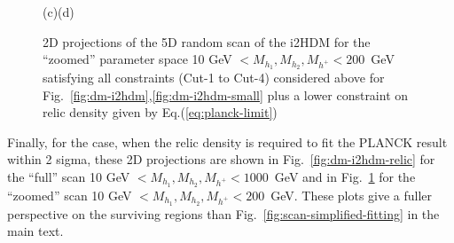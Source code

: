 \documentclass[12pt,a4paper]{article}
\newcommand {\blue} {\color{blue}}
\begin{document}
\begin{figure}[htb]
\vskip -0.8cm
\hspace*{1cm}(c)\hspace*{0.55\textwidth}\hspace*{-1.5cm}(d)
\caption{2D projections of the 5D random scan of the i2HDM for the ``zoomed'' parameter space
10 GeV $< M_{h_1}, M_{h_2}, M_{h^{+}} < 200$~GeV satisfying all constraints
(Cut-1 to Cut-4) considered above for Fig.~\ref{fig:dm-i2hdm},\ref{fig:dm-i2hdm-small} plus a
lower constraint on relic density given by  Eq.(\ref{eq:planck-limit})}
\label{fig:dm-i2hdm-relic-small}
\end{figure}

{\blue Finally, for the case, when the relic density is required to fit the PLANCK result within 2 sigma,
these 2D projections are shown in Fig.~\ref{fig:dm-i2hdm-relic} for the ``full'' scan 
10 GeV $< M_{h_1}, M_{h_2}, M_{h^{+}} < 1000$~GeV and in Fig.~\ref{fig:dm-i2hdm-relic-small} 
for the ``zoomed'' scan 10 GeV $< M_{h_1}, M_{h_2}, M_{h^{+}} < 200$~GeV.
These plots give a fuller perspective on the surviving regions than Fig.~\ref{fig:scan-simplified-fitting}
in the main text.}





%
%

\end{document}
